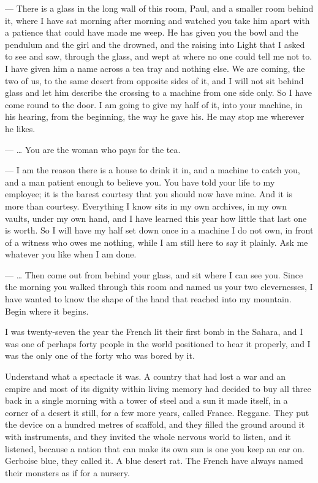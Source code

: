 
\begin{room}

--- There is a glass in the long wall of this room, Paul, and a smaller room behind it, where I have sat morning after morning and watched you take him apart with a patience that could have made me weep. He has given you the bowl and the pendulum and the girl and the drowned, and the raising into Light that I asked to see and saw, through the glass, and wept at where no one could tell me not to. I have given him a name across a tea tray and nothing else. We are coming, the two of us, to the same desert from opposite sides of it, and I will not sit behind glass and let him describe the crossing to a machine from one side only. So I have come round to the door. I am going to give my half of it, into your machine, in his hearing, from the beginning, the way he gave his. He may stop me wherever he likes.

--- \ldots{} You are the woman who pays for the tea.

--- I am the reason there is a house to drink it in, and a machine to catch you, and a man patient enough to believe you. You have told your life to my employee; it is the barest courtesy that you should now have mine. And it is more than courtesy. Everything I know sits in my own archives, in my own vaults, under my own hand, and I have learned this year how little that last one is worth. So I will have my half set down once in a machine I do not own, in front of a witness who owes me nothing, while I am still here to say it plainly. Ask me whatever you like when I am done.

--- \ldots{} Then come out from behind your glass, and sit where I can see you. Since the morning you walked through this room and named us your two clevernesses, I have wanted to know the shape of the hand that reached into my mountain. Begin where it begins.

\end{room}

I was twenty-seven the year the French lit their first bomb in the Sahara, and I was one of perhaps forty people in the world positioned to hear it properly, and I was the only one of the forty who was bored by it.\par

Understand what a spectacle it was. A country that had lost a war and an empire and most of its dignity within living memory had decided to buy all three back in a single morning with a tower of steel and a sun it made itself, in a corner of a desert it still, for a few more years, called France. Reggane. They put the device on a hundred metres of scaffold, and they filled the ground around it with instruments, and they invited the whole nervous world to listen, and it listened, because a nation that can make its own sun is one you keep an ear on. Gerboise blue, they called it. A blue desert rat. The French have always named their monsters as if for a nursery.\par

